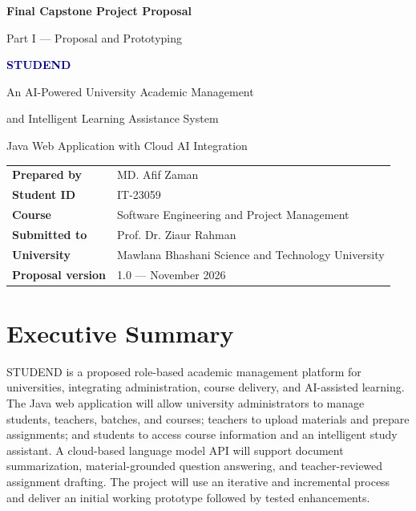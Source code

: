 \documentclass[11pt,a4paper]{article}
\begin{document}
\begin{titlepage}
\thispagestyle{empty}
\begin{center}
\vspace*{1.15cm}
{\Large\bfseries Final Capstone Project Proposal\par}
\vspace{0.30cm}
{\large Part I --- Proposal and Prototyping\par}
\vspace{1.25cm}
{\Huge\bfseries\textcolor{navy}{STUDEND}\par}
\vspace{0.45cm}
{\Large An AI-Powered University Academic Management\par}
\vspace{0.12cm}
{\Large and Intelligent Learning Assistance System\par}
\vspace{0.65cm}
{\normalsize Java Web Application with Cloud AI Integration\par}
\vspace{3.25cm}
\begin{minipage}{0.88\textwidth}
\renewcommand{\arraystretch}{1.45}
\begin{tabular}{@{}p{3.3cm}p{9.3cm}@{}}
\textbf{Prepared by} & MD. Afif Zaman \\
\textbf{Student ID} & IT-23059 \\
\textbf{Course} & Software Engineering and Project Management \\
\textbf{Submitted to} & Prof. Dr. Ziaur Rahman \\
\textbf{University} & Mawlana Bhashani Science and Technology University \\
\textbf{Proposal version} & 1.0 --- November 2026
\end{tabular}
\end{minipage}
\end{center}
\vfill
\end{titlepage}
\tableofcontents\newpage
\section{Executive Summary}
STUDEND is a proposed role-based academic management platform for universities, integrating administration, course delivery, and AI-assisted learning. The Java web application will allow university administrators to manage students, teachers, batches, and courses; teachers to upload materials and prepare assignments; and students to access course information and an intelligent study assistant. A cloud-based language model API will support document summarization, material-grounded question answering, and teacher-reviewed assignment drafting. The project will use an iterative and incremental process and deliver an initial working prototype followed by tested enhancements.
\end{document}
